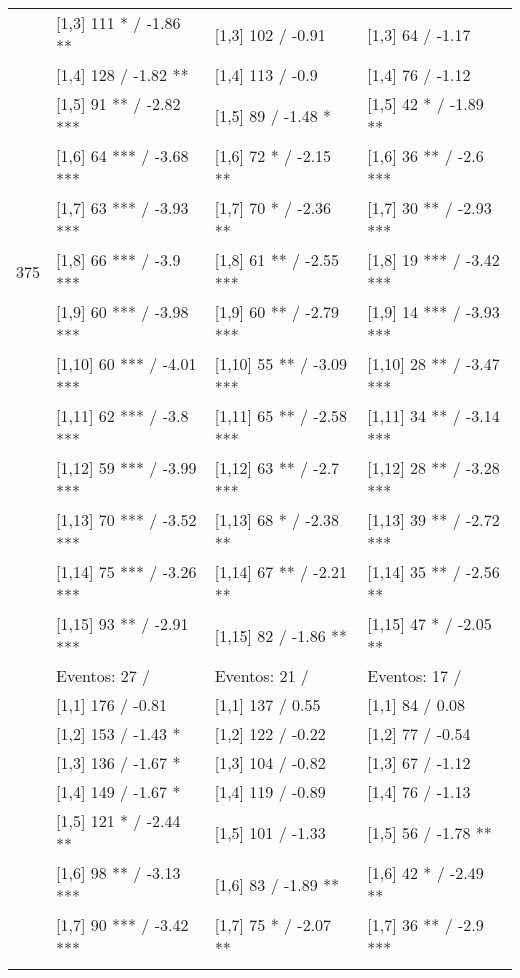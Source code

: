 \begin{table}
\begin{tabular}[t]{llll}
 & {}[1,3] 111 * / -1.86 ** & {}[1,3] 102  / -0.91 & {}[1,3] 64  / -1.17\\
\addlinespace
 & {}[1,4] 128  / -1.82 ** & {}[1,4] 113  / -0.9 & {}[1,4] 76  / -1.12\\
 & {}[1,5] 91 ** / -2.82 *** & {}[1,5] 89  / -1.48 * & {}[1,5] 42 * / -1.89 **\\
 & {}[1,6] 64 *** / -3.68 *** & {}[1,6] 72 * / -2.15 ** & {}[1,6] 36 ** / -2.6 ***\\
 & {}[1,7] 63 *** / -3.93 *** & {}[1,7] 70 * / -2.36 ** & {}[1,7] 30 ** / -2.93 ***\\
375 & {}[1,8] 66 *** / -3.9 *** & {}[1,8] 61 ** / -2.55 *** & {}[1,8] 19 *** / -3.42 ***\\
\addlinespace
 & {}[1,9] 60 *** / -3.98 *** & {}[1,9] 60 ** / -2.79 *** & {}[1,9] 14 *** / -3.93 ***\\
 & {}[1,10] 60 *** / -4.01 *** & {}[1,10] 55 ** / -3.09 *** & {}[1,10] 28 ** / -3.47 ***\\
 & {}[1,11] 62 *** / -3.8 *** & {}[1,11] 65 ** / -2.58 *** & {}[1,11] 34 ** / -3.14 ***\\
 & {}[1,12] 59 *** / -3.99 *** & {}[1,12] 63 ** / -2.7 *** & {}[1,12] 28 ** / -3.28 ***\\
 & {}[1,13] 70 *** / -3.52 *** & {}[1,13] 68 * / -2.38 ** & {}[1,13] 39 ** / -2.72 ***\\
\addlinespace
 & {}[1,14] 75 *** / -3.26 *** & {}[1,14] 67 ** / -2.21 ** & {}[1,14] 35 ** / -2.56 **\\
 & {}[1,15] 93 ** / -2.91 *** & {}[1,15] 82  / -1.86 ** & {}[1,15] 47 * / -2.05 **\\
 & Eventos:  27 / & Eventos:  21 / & Eventos:  17 /\\
 & {}[1,1] 176  / -0.81 & {}[1,1] 137  / 0.55 & {}[1,1] 84  / 0.08\\
 & {}[1,2] 153  / -1.43 * & {}[1,2] 122  / -0.22 & {}[1,2] 77  / -0.54\\
\addlinespace
 & {}[1,3] 136  / -1.67 * & {}[1,3] 104  / -0.82 & {}[1,3] 67  / -1.12\\
 & {}[1,4] 149  / -1.67 * & {}[1,4] 119  / -0.89 & {}[1,4] 76  / -1.13\\
 & {}[1,5] 121 * / -2.44 ** & {}[1,5] 101  / -1.33 & {}[1,5] 56  / -1.78 **\\
 & {}[1,6] 98 ** / -3.13 *** & {}[1,6] 83  / -1.89 ** & {}[1,6] 42 * / -2.49 **\\
 & {}[1,7] 90 *** / -3.42 *** & {}[1,7] 75 * / -2.07 ** & {}[1,7] 36 ** / -2.9 ***\\
\addlinespace

\end{tabular}
\end{table}
